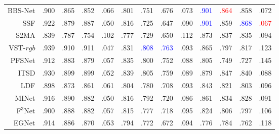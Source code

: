 \begin{table}[!ht]
{\begin{tabular}{rcccccccccccc}
			
			BBS-Net     \cite{fan2020bbs} 
			& .900 & .865 & .852 & .066 
			& .801 & .751 & .676 & .073 
			& \textcolor{blue}{.901} & {\textcolor{red}{.864}} & .858 & .072 \\ 
			
			SSF     \cite{zhang2020select} 
			& .922 & .879 & .887 & .050 
			& .816 & .725 & .647 & .090 
			& \textcolor{blue}{.901} & .859 & \textcolor{blue}{.868} & {\textcolor{red}{.067}} \\ 
			
			S2MA    \cite{liu2020learning} 
			& .839 & .787 & .754 & 	.102 
			& .777 & .729 & .650 & .112 
			& .873 & .837 &	.835 & .094 \\
			
			
			\midrule %
			
			VST-$rgb$ \cite{liu2021visual} 
			& .939 & .910 & .911 & .047
			& .831 & \textcolor{blue}{.808} & \textcolor{blue}{.763} & .093 
			& .865 & .797 & .817 & .123 
			\\ 
			
			PFSNet \cite{ma2021pyramidal}
			& .912 & .883 & .879 & .057 
			& .835 & .800 & .752 & .088 
			& .805 & .749 & .727 & .145 
			\\ 
			
			
			ITSD \cite{zhou2020interactive} 
			& .930 & .899 & .899 & .052 
			& .839 & .805 & .759 & .089 
			& .879 & .847 & .840 & .088 
			\\ 
			
			
			
			LDF \cite{wei2020label} 
			& .898 & .873 & .861 & .061 
			& .804 & .780 & .708 & .093 
			& .843 & .821 & .803 & .096 
			\\ 
			
			
			MINet \cite{pang2020multi} 
			& .916 & .890 & .882 & .050 
			& .816 & .792 & .720 & .086 
			& .861 & .834 & .828 & .091 
			\\ 
			
			F$^{3}$Net  \cite{wei2020f3net}
			& .900 & .888 & .882 & .057 
			& .815 & .777 & .718 & .095 
			& .824 & .806 & .797 & .106 
			\\ 
			
			
			EGNet   \cite{zhao2019egnet}
			& .914 & .886 & .870 & .053 
			& .794 & .772 & .672 & .094 
			& .776 & .784 & .762 & .118 
			\\ 
			

\end{tabular}}
\end{table}
